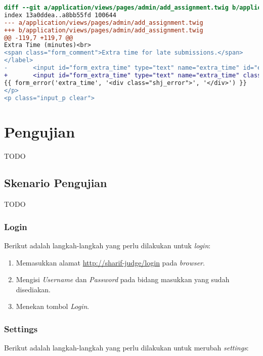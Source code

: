 \begin{lstlisting}[language=diff, caption=Perubahan untuk mematuhi kriteria 4.1.1, label=lst_4.1.1, basicstyle=\ttfamily, frame=single,
columns=fullflexible, keepspaces=true, breaklines=true]
diff --git a/application/views/pages/admin/add_assignment.twig b/application/views/pages/admin/add_assignment.twig
index 13a0ddea..a8bb55fd 100644
--- a/application/views/pages/admin/add_assignment.twig
+++ b/application/views/pages/admin/add_assignment.twig
@@ -119,7 +119,7 @@
Extra Time (minutes)<br>
<span class="form_comment">Extra time for late submissions.</span>
</label>
- 		<input id="form_extra_time" type="text" name="extra_time" id="extra_time" class="sharif_input medium" value="{{ edit ? edit_assignment.extra_time|extra_time_formatter : set_value('extra_time') }}" />
+ 		<input id="form_extra_time" type="text" name="extra_time" class="sharif_input medium" value="{{ edit ? edit_assignment.extra_time|extra_time_formatter : set_value('extra_time') }}" />
{{ form_error('extra_time', '<div class="shj_error">', '</div>') }}
</p>
<p class="input_p clear">
\end{lstlisting}

\section{Pengujian}
\label{sec:pengujian}
TODO

\subsection{Skenario Pengujian}
\label{subsec:skenario_pengujian}
TODO

\subsubsection{Login}
\label{subsubsec:skenario_login}
Berikut adalah langkah-langkah yang perlu dilakukan untuk \textit{login}:

\begin{enumerate}
	\item Memasukkan alamat \url{http://sharif-judge/login} pada \textit{browser}.
	\item Mengisi \textit{Username} dan \textit{Password} pada bidang masukkan yang sudah disediakan.
	\item Menekan tombol \textit{Login}.
\end{enumerate}

\subsubsection{Settings}
\label{subsubsec:skenario_settings}
Berikut adalah langkah-langkah yang perlu dilakukan untuk merubah \textit{settings}:

